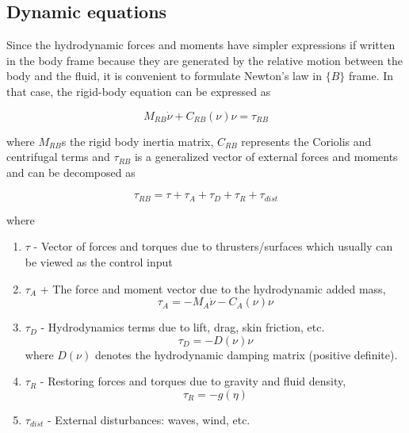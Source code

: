 \subsection{Dynamic equations}

Since the hydrodynamic forces and moments have simpler expressions if written in the body frame because they are generated by the relative motion between the body and the fluid, it is convenient to formulate Newton’s law in $\{B\}$ frame. In that case, the rigid-body equation can be expressed as

\begin{equation}
    M_{RB}\dot{\nu} + C_{RB}(\nu)\nu = \tau_{RB}
    \label{eq:rigid_body}
\end{equation}

where $M_{RB}$s the rigid body inertia matrix, $C_{RB}$ represents the Coriolis and centrifugal terms and $\tau_{RB}$ is a generalized vector of external forces and moments and can be decomposed as
 
\begin{equation}
    \tau_{RB} = \tau + \tau_A + \tau_D + \tau_R + \tau_{dist}
    \label{eq:tau_rb}
\end{equation}

where
\begin{enumerate}
    \item $\tau$ - Vector of forces and torques due to thrusters/surfaces which usually can be viewed as the control input
    \item $\tau_A$ + The force and moment vector due to the hydrodynamic added mass,
    \begin{equation}
        \tau_A = - M_A \dot{\nu} - C_A(\nu)\nu
        \label{eq:tau_a}
    \end{equation}
    \item $\tau_D$ - Hydrodynamics terms due to lift, drag, skin friction, etc.
    \begin{equation}
        \tau_D = - D(\nu)\nu
        \label{eq:tau_d}
    \end{equation}
    where $D(\nu)$ denotes the hydrodynamic damping matrix (positive definite).
    \item $\tau_R$ - Restoring forces and torques due to gravity and fluid density,
    \begin{equation}
        \tau_R = -g(\eta)
        \label{eq:tau_r}
    \end{equation}
    \item $\tau_{dist}$ - External disturbances: waves, wind, etc.
\end{enumerate}

